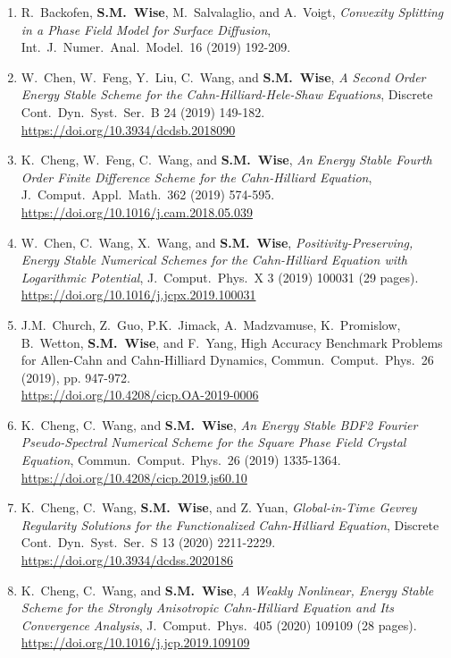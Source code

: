 \documentclass[11pt]{letter}
\begin{document}
\begin{enumerate}
	\item
R.~Backofen, \textbf{S.M.~Wise}, M.~Salvalaglio, and A.~Voigt, {\sl Convexity Splitting in a Phase Field Model for Surface Diffusion}, Int.~J.~Numer.~Anal.~Model.~16 (2019) 192-209.

	\item
W.~Chen, W.~Feng, Y.~Liu, C.~Wang, and \textbf{S.M.~Wise}, {\sl A Second Order Energy Stable Scheme for the Cahn-Hilliard-Hele-Shaw Equations}, Discrete Cont.~Dyn.~Syst.~Ser.~B 24 (2019) 149-182.
	\\ 
\url{https://doi.org/10.3934/dcdsb.2018090}

		\item
K.~Cheng, W.~Feng, C.~Wang, and \textbf{S.M.~Wise}, {\sl An Energy Stable Fourth Order Finite Difference Scheme for the Cahn-Hilliard Equation}, J.~Comput.~Appl.~Math.~362 (2019) 574-595.
	\\ 
\url{https://doi.org/10.1016/j.cam.2018.05.039}

    \item
W.~Chen, C.~Wang, X.~Wang, and \textbf{S.M.~Wise}, {\sl Positivity-Preserving, Energy Stable Numerical Schemes for the Cahn-Hilliard Equation with Logarithmic Potential}, J.~Comput.~Phys.~X 3 (2019) 100031 (29 pages).
	\\ 
\url{https://doi.org/10.1016/j.jcpx.2019.100031}

	\item
J.M.~Church, Z.~Guo, P.K.~Jimack, A.~Madzvamuse, K.~Promislow, B.~Wetton, \textbf{S.M.~Wise}, and F.~Yang, {High Accuracy Benchmark Problems for Allen-Cahn and Cahn-Hilliard Dynamics},  Commun.~Comput.~Phys.~26 (2019), pp. 947-972.
	\\ 
\url{https://doi.org/10.4208/cicp.OA-2019-0006}

	\item
K.~Cheng, C.~Wang, and \textbf{S.M.~Wise}, {\sl An Energy Stable BDF2 Fourier Pseudo-Spectral Numerical Scheme for the Square Phase Field Crystal Equation}, Commun.~Comput.~Phys.~26 (2019) 1335-1364.
	\\ 
\url{https://doi.org/10.4208/cicp.2019.js60.10}

	\item
K.~Cheng, C.~Wang, \textbf{S.M.~Wise}, and Z. Yuan, {\sl Global-in-Time Gevrey Regularity Solutions for the Functionalized Cahn-Hilliard Equation}, Discrete Cont.~Dyn.~Syst.~Ser.~S 13 (2020) 2211-2229.
	\\ 
\url{https://doi.org/10.3934/dcdss.2020186}

	\item
K.~Cheng, C.~Wang, and \textbf{S.M.~Wise}, {\sl A Weakly Nonlinear, Energy Stable Scheme for the Strongly Anisotropic Cahn-Hilliard Equation and Its Convergence Analysis}, J.~Comput.~Phys.~405 (2020) 109109 (28 pages).
	\\ 
\url{https://doi.org/10.1016/j.jcp.2019.109109}


\end{enumerate}
\end{document}

